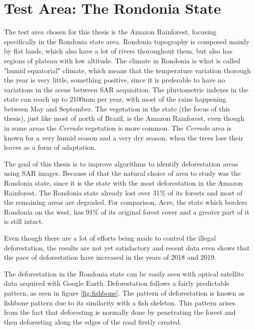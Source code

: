 


\section{Test Area: The Rondonia State}
\par
The test area chosen for this thesis is the Amazon Rainforest, focusing specifically in the Rondonia state area. Rondonia topography is composed mainly by flat lands, which also have a lot of rivers thoroughout them, but also has regions of plateau with low altitude. The climate in Rondonia is what is called "humid equatorial" climate, which means that the temperature variation thorough the year is very little, something positive, since it is preferable to have no variations in the scene between SAR acquisition. The pluviometric indexes in the state can reach up to 2100mm per year, with most of the rains happening between May and September. The vegetation in the state (the focus of this thesis), just like most of north of Brazil, is the Amazon Rainforest, even though in some areas the \textit{Cerrado} vegetation is more common. The \textit{Cerrado} area is known for a very humid season and a very dry season, when the trees lose their leaves as a form of adaptation.
\par
The goal of this thesis is to improve algorithms to identify deforestation areas using SAR images. Because of that the natural choice of area to study was the Rondonia state, since it is the state with the most deforestation in the Amazon Rainforest. The Rondonia state already lost over 31\% of its forests and most of the remaining areas are degraded. For comparison, Acre, the state which borders Rondonia on the west, has 91\% of its original forest cover and a greater part of it is still intact. 
\par
Even though there are a lot of efforts being made to control the illegal deforestation, the results are not yet satisfactory and recent data even shows that the pace of deforestation have increased in the years of 2018 and 2019.\par
The deforestation in the Rondonia state can be easily seen with optical satellite data acquired with Google Earth. Deforestation follows a fairly predictable pattern, as seen in figure \ref{fig:fishbone}. The pattern of deforestation is known as fishbone pattern due to its similarity with a fish skeleton. This pattern arises from the fact that deforesting is normally done by penetrating the forest and then deforesting along the edges of the road firstly created.

